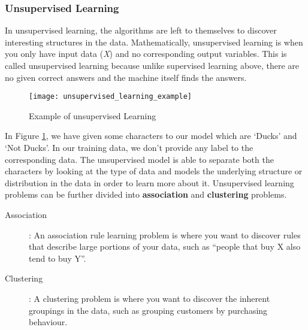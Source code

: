 \subsubsection{Unsupervised Learning}

In unsupervised learning, the algorithms are left to themselves to discover interesting structures in the data. Mathematically, unsupervised
learning is when you only have input data (\textit{X}) and no corresponding output variables. This is called unsupervised learning because
unlike supervised learning above, there are no given correct answers and the machine itself finds the answers.
\begin{figure}[h]
  \centering
  \texttt{[image: unsupervised\_learning\_example]}
  \caption{Example of unsupervised Learning}
  \label{fig:unsupervised_learning_example}
\end{figure}
In Figure \ref{fig:unsupervised_learning_example}, we have given some characters to our model which are ‘Ducks’ and ‘Not Ducks’. In our
training data, we don’t provide any label to the corresponding data. The unsupervised model is able to separate both the characters by
looking at the type of data and models the underlying structure or distribution in the data in order to learn more about it. Unsupervised
learning problems can be further divided into \textbf{association} and \textbf{clustering} problems.

\begin{description}
\item[ Association] : An association rule learning problem is where you want to discover rules that describe large portions of your data, such as “people that buy X also tend to buy Y”.
\item[ Clustering] : A clustering problem is where you want to discover the inherent groupings in the data, such as grouping customers by purchasing behaviour.
\end{description}

